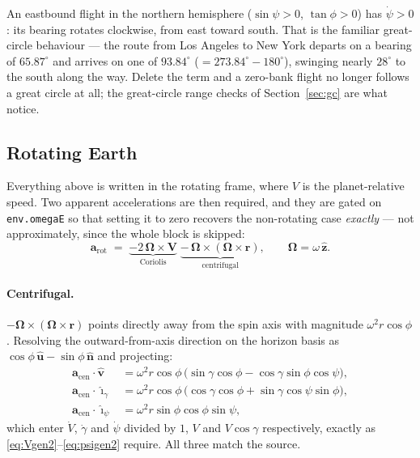 \documentclass[11pt]{article}
\newcommand{\vhat}{\hat{\mathbf{v}}}
\newcommand{\ig}{\hat{\boldsymbol{\imath}}_{\gamma}}
\newcommand{\ip}{\hat{\boldsymbol{\imath}}_{\psi}}
\newcommand{\nhat}{\hat{\mathbf{n}}}
\newcommand{\uhat}{\hat{\mathbf{u}}}
\newcommand{\zhat}{\hat{\mathbf{z}}}
\newcommand{\bOmega}{\boldsymbol{\Omega}}
\newcommand{\code}[1]{\texttt{#1}}
\begin{document}
An eastbound flight in the northern hemisphere ($\sin\psi>0$, $\tan\phi>0$) has
$\dot\psi>0$: its bearing rotates clockwise, from east toward south. That is
the familiar great-circle behaviour --- the route from Los Angeles to New York
departs on a bearing of $65.87^{\circ}$ and arrives on one of $93.84^{\circ}$
($=273.84^{\circ}-180^{\circ}$), swinging nearly $28^{\circ}$ to the south
along the way. Delete the term and a zero-bank flight no longer follows a great
circle at all; the great-circle range checks of Section~\ref{sec:gc} are what
notice.

\subsection{Rotating Earth}
\label{sec:rotating}

Everything above is written in the rotating frame, where $V$ is the
planet-relative speed. Two apparent accelerations are then required, and they
are gated on \code{env.omegaE} so that setting it to zero recovers the
non-rotating case \emph{exactly} --- not approximately, since the whole block
is skipped:
\begin{equation}
  \mathbf{a}_{\text{rot}} \;=\;
  \underbrace{-2\,\bOmega\times\mathbf{V}}_{\text{Coriolis}}
  \;\underbrace{-\,\bOmega\times(\bOmega\times\mathbf{r})}_{\text{centrifugal}},
  \qquad \bOmega = \omega\,\zhat .
  \label{eq:arot}
\end{equation}

\paragraph{Centrifugal.}
$-\bOmega\times(\bOmega\times\mathbf{r})$ points directly away from the spin
axis with magnitude $\omega^2 r\cos\phi$. Resolving the outward-from-axis
direction on the horizon basis as $\cos\phi\,\uhat - \sin\phi\,\nhat$ and
projecting:
\begin{align}
  \mathbf{a}_{\text{cen}}\cdot\vhat
    &= \omega^2 r\cos\phi\,\bigl(\sin\gamma\cos\phi
       - \cos\gamma\sin\phi\cos\psi\bigr) ,                      \label{eq:cenv}\\
  \mathbf{a}_{\text{cen}}\cdot\ig
    &= \omega^2 r\cos\phi\,\bigl(\cos\gamma\cos\phi
       + \sin\gamma\cos\psi\sin\phi\bigr) ,                      \label{eq:ceng}\\
  \mathbf{a}_{\text{cen}}\cdot\ip
    &= \omega^2 r\sin\phi\cos\phi\sin\psi ,                      \label{eq:cenp}
\end{align}
which enter $\dot V$, $\dot\gamma$ and $\dot\psi$ divided by $1$, $V$ and
$V\cos\gamma$ respectively, exactly as \eqref{eq:Vgen2}--\eqref{eq:psigen2}
require. All three match the source.
\end{document}
